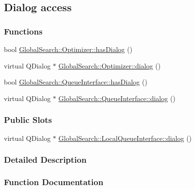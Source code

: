 \hypertarget{group__dialog}{}\subsection{Dialog access}
\label{group__dialog}
\subsubsection*{Functions}
\begin{DoxyCompactItemize}
\item 
bool \hyperlink{group__dialog_gac4335196cdf08e3555f6d0e152761604}{Global\+Search\+::\+Optimizer\+::has\+Dialog} ()
\item 
virtual Q\+Dialog $\ast$ \hyperlink{group__dialog_ga9455d181accc40edd3ca6271fdc1e050}{Global\+Search\+::\+Optimizer\+::dialog} ()
\item 
bool \hyperlink{group__dialog_gaa78e95fa76777efba3cdfd70d8e3caf9}{Global\+Search\+::\+Queue\+Interface\+::has\+Dialog} ()
\item 
virtual Q\+Dialog $\ast$ \hyperlink{group__dialog_ga4457d66b93f0406af1b595659ca25dcf}{Global\+Search\+::\+Queue\+Interface\+::dialog} ()
\end{DoxyCompactItemize}
\subsubsection*{Public Slots}
\begin{DoxyCompactItemize}
\item 
virtual Q\+Dialog $\ast$ \hyperlink{group__dialog_ga4bd87bf2050209a72d1a35c824e515da}{Global\+Search\+::\+Local\+Queue\+Interface\+::dialog} ()
\end{DoxyCompactItemize}


\subsubsection{Detailed Description}


\subsubsection{Function Documentation}
\hypertarget{group__dialog_ga4457d66b93f0406af1b595659ca25dcf}{}
